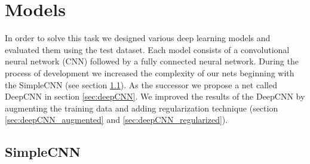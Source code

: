 \documentclass[a4paper]{article}
\begin{document}
\section{Models}

In order to solve this task we designed various deep learning models and evaluated them using the test dataset. Each model consists of a convolutional neural network (CNN) followed by a fully connected neural network. During the process of development we increased the complexity of our nets beginning with the SimpleCNN (see section \ref{sec:simpleCNN}). As the successor we propose a net called  DeepCNN in section \ref{sec:deepCNN}. We improved the results of the DeepCNN by augmenting the training data and adding regularization technique (section \ref{sec:deepCNN_augmented} and \ref{sec:deepCNN_regularized}).

\subsection{SimpleCNN}\label{sec:simpleCNN}
\end{document}
